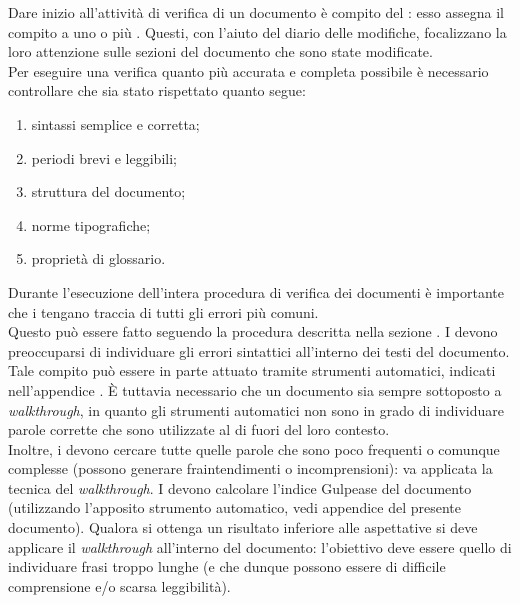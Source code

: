 					Dare inizio all'attività di verifica di un documento è compito del : esso assegna il compito a uno o più . Questi, con l'aiuto del diario delle modifiche, focalizzano la loro attenzione sulle sezioni del documento che sono state modificate.\\
Per eseguire una verifica quanto più accurata e completa possibile è necessario controllare che sia stato rispettato quanto segue:
					\begin{enumerate}
						\item sintassi semplice e corretta;
						\item periodi brevi e leggibili;
						\item struttura del documento;
						\item norme tipografiche;
						\item proprietà di glossario.
					\end{enumerate}
					Durante l'esecuzione dell'intera procedura di verifica dei documenti è importante che i  tengano traccia di tutti gli errori più comuni.\\ Questo può essere fatto seguendo la procedura descritta nella sezione .
						I  devono preoccuparsi di individuare gli errori sintattici all'interno dei testi del documento. Tale compito può essere in parte attuato tramite strumenti automatici, indicati nell'appendice . È tuttavia necessario che un documento sia sempre sottoposto a \textit{walkthrough}, in quanto gli strumenti automatici non sono in grado di individuare parole corrette che sono utilizzate al di fuori del loro contesto.\\ Inoltre, i  devono cercare tutte quelle parole che sono poco frequenti o comunque complesse (possono generare fraintendimenti o incomprensioni): va applicata la tecnica del \textit{walkthrough}.
						I  devono calcolare l'indice Gulpease del documento (utilizzando l'apposito strumento automatico, vedi appendice  del presente documento). Qualora si ottenga un risultato inferiore alle aspettative si deve applicare il \textit{walkthrough} all'interno del documento: l'obiettivo deve essere quello di individuare frasi troppo lunghe (e che dunque possono essere di difficile comprensione e/o scarsa leggibilità).
